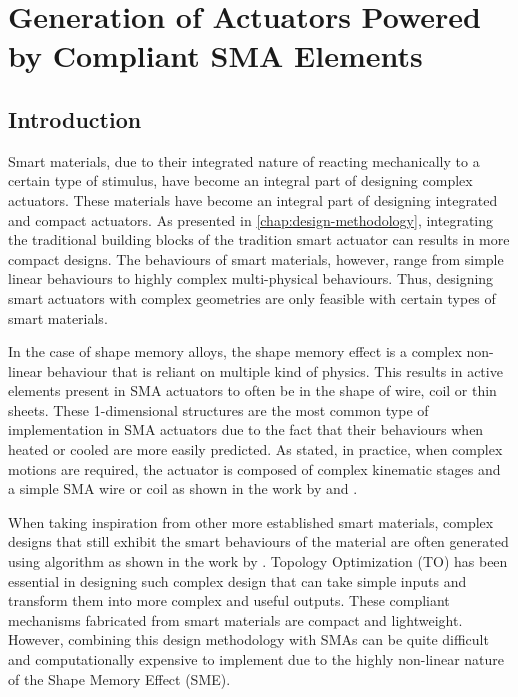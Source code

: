 
\chapter{Generation of Actuators Powered by Compliant SMA Elements}\label{chap:compliant-sma}
\section{Introduction}
Smart materials, due to their integrated nature of reacting mechanically to a certain type of stimulus, have become an integral part of designing complex actuators. These materials have become an integral part of designing integrated and compact actuators. As presented in \cref{chap:design-methodology}, integrating the traditional building blocks of the tradition smart actuator can results in more compact designs. The behaviours of smart materials, however, range from simple linear behaviours to highly complex multi-physical behaviours. Thus, designing smart actuators with complex geometries are only feasible with certain types of smart materials.

In the case of shape memory alloys, the shape memory effect is a complex non-linear behaviour that is reliant on multiple kind of physics. This results in active elements present in SMA actuators to often be in the shape of wire, coil or thin sheets. These 1-dimensional structures are the most common type of implementation in SMA actuators due to the fact that their behaviours when heated or cooled are more easily predicted. As stated, in practice, when complex motions are required, the actuator is composed of complex kinematic stages and a simple SMA wire or coil as shown in the work by \cite{singhCompactCompliantExternal2013} and \cite{hwangPlanarWobbleMotor2016}.

When taking inspiration from other more established smart materials, complex designs that still exhibit the smart behaviours of the material are often generated using algorithm as shown in the work by \cite{ruizOptimalDesignRobust2018}. Topology Optimization (TO) has been essential in designing such complex design that can take simple inputs and transform them into more complex and useful outputs. These compliant mechanisms fabricated from smart materials are compact and lightweight. However, combining this design methodology with SMAs can be quite difficult and computationally expensive to implement due to the highly non-linear nature of the Shape Memory Effect (SME).

